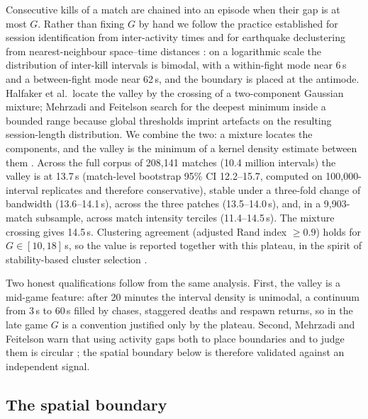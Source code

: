 Consecutive kills of a match are chained into an episode when their gap is at most $G$.
Rather than fixing $G$ by hand we follow the practice established for session
identification from inter-activity times \cite{halfaker2015session,mehrzadi2012session}
and for earthquake declustering from nearest-neighbour space--time distances
\cite{zaliapin2013clusters}: on a logarithmic scale the distribution of inter-kill
intervals is bimodal, with a within-fight mode near 6\,s and a between-fight mode near
62\,s, and the boundary is placed at the antimode. Halfaker et al.\ locate the valley by
the crossing of a two-component Gaussian mixture; Mehrzadi and Feitelson search for the
deepest minimum inside a bounded range because global thresholds imprint artefacts on the
resulting session-length distribution. We combine the two: a mixture locates the
components, and the valley is the minimum of a kernel density estimate between them
\cite{silverman1981multimodality}. Across the full corpus of 208,141 matches
(10.4 million intervals) the valley is at 13.7\,s (match-level bootstrap 95\% CI
12.2--15.7, computed on 100,000-interval replicates and therefore conservative), stable
under a three-fold change of bandwidth (13.6--14.1\,s), across the three patches
(13.5--14.0\,s), and, in a 9,903-match subsample, across match intensity terciles
(11.4--14.5\,s). The mixture crossing gives 14.5\,s. Clustering agreement (adjusted Rand
index $\geq 0.9$) holds for $G \in [10, 18]$\,s, so the value is reported together with
this plateau, in the spirit of stability-based cluster selection
\cite{campello2013hdbscan}.

Two honest qualifications follow from the same analysis. First, the valley is a mid-game
feature: after 20 minutes the interval density is unimodal, a continuum from 3\,s to 60\,s
filled by chases, staggered deaths and respawn returns, so in the late game $G$ is a
convention justified only by the plateau. Second, Mehrzadi and Feitelson warn that using
activity gaps both to place boundaries and to judge them is circular
\cite{mehrzadi2012session}; the spatial boundary below is therefore validated against an
independent signal.

\subsection{The spatial boundary}

